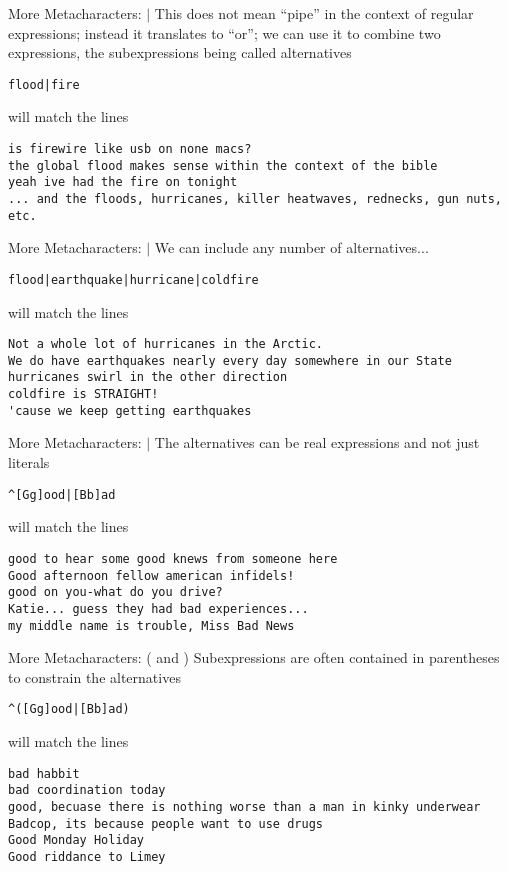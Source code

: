 \documentclass[aspectratio=169]{beamer}
\begin{document}
\begin{frame}[fragile]{More Metacharacters: $|$}
This does not mean ``pipe'' in the context of regular expressions;
instead it translates to ``or''; we can use it to combine two
expressions, the subexpressions being called alternatives
\begin{verbatim}
flood|fire
\end{verbatim}
will match the lines 
\begin{verbatim}
is firewire like usb on none macs? 
the global flood makes sense within the context of the bible 
yeah ive had the fire on tonight 
... and the floods, hurricanes, killer heatwaves, rednecks, gun nuts, etc. 
\end{verbatim}
\end{frame}

\begin{frame}[fragile]{More Metacharacters: $|$}
We can include any number of alternatives...
\begin{verbatim}
flood|earthquake|hurricane|coldfire
\end{verbatim}
will match the lines 
\begin{verbatim}
Not a whole lot of hurricanes in the Arctic.
We do have earthquakes nearly every day somewhere in our State 
hurricanes swirl in the other direction 
coldfire is STRAIGHT! 
'cause we keep getting earthquakes
\end{verbatim}
\end{frame}

\begin{frame}[fragile]{More Metacharacters: $|$}
The alternatives can be real expressions and not just literals
\begin{verbatim}
^[Gg]ood|[Bb]ad
\end{verbatim}
will match the lines 
\begin{verbatim}
good to hear some good knews from someone here 
Good afternoon fellow american infidels! 
good on you-what do you drive? 
Katie... guess they had bad experiences... 
my middle name is trouble, Miss Bad News
\end{verbatim}
\end{frame}

\begin{frame}[fragile]{More Metacharacters: ( and )}
Subexpressions are often contained in parentheses to constrain the 
alternatives
\begin{verbatim}
^([Gg]ood|[Bb]ad)
\end{verbatim}
will match the lines 
\begin{verbatim}
bad habbit 
bad coordination today 
good, becuase there is nothing worse than a man in kinky underwear
Badcop, its because people want to use drugs 
Good Monday Holiday 
Good riddance to Limey
\end{verbatim}
\end{frame}
\end{document}
